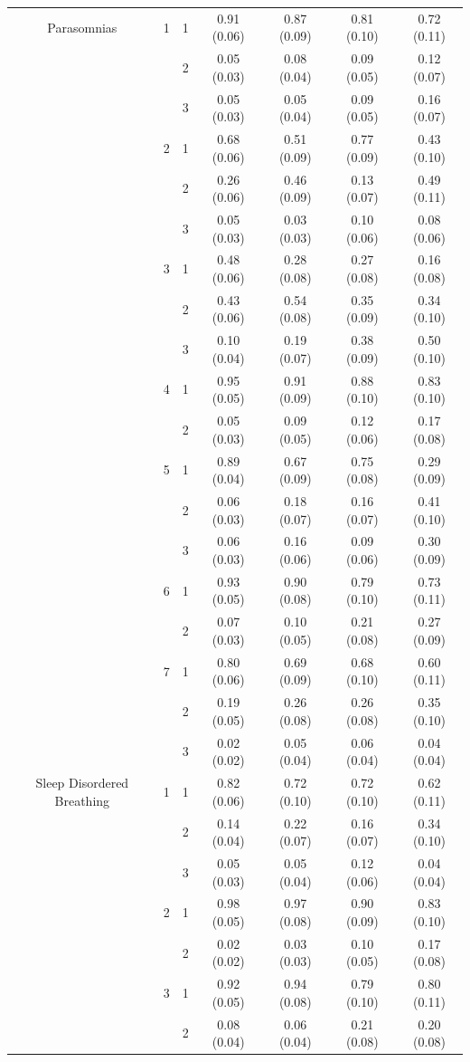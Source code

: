\documentclass[11pt]{article}
\theoremstyle{plain}
\theoremstyle{definition}
\begin{document}
\begin{longtable}{clccccc}
 Parasomnias  & 1 & 1  & 0.91  (0.06) &  0.87  (0.09) &  0.81 (0.10) & 0.72 (0.11) \\
 & & 2  & 0.05 (0.03) &  0.08  (0.04) & 0.09  (0.05) & 0.12 (0.07)\\
 & & 3  & 0.05 (0.03) &  0.05 (0.04) &  0.09 (0.05) & 0.16 (0.07)\\
  & 2 & 1  & 0.68  (0.06) &  0.51  (0.09) & 0.77  (0.09) & 0.43 (0.10)\\
 & & 2  & 0.26 (0.06) &  0.46  (0.09) & 0.13  (0.07) & 0.49 (0.11)\\
 & & 3  & 0.05 (0.03) &  0.03  (0.03) & 0.10  (0.06) & 0.08 (0.06)\\
   & 3 & 1  & 0.48 (0.06) &  0.28  (0.08) & 0.27  (0.08) & 0.16 (0.08)\\
 & & 2  & 0.43 (0.06) &  0.54  (0.08) & 0.35  (0.09) & 0.34 (0.10)\\
 & & 3  & 0.10 (0.04) &  0.19  (0.07) & 0.38  (0.09) & 0.50 (0.10)\\
    & 4 & 1  & 0.95  (0.05) &  0.91  (0.09) & 0.88  (0.10) & 0.83 (0.10)\\
 & & 2  & 0.05 (0.03) &  0.09  (0.05) & 0.12  (0.06) & 0.17 (0.08)\\
    & 5 & 1  & 0.89 (0.04) &  0.67  (0.09) & 0.75  (0.08) & 0.29 (0.09)\\
 & & 2  & 0.06 (0.03) &  0.18  (0.07) & 0.16  (0.07) & 0.41 (0.10)\\
 & & 3  & 0.06 (0.03) &  0.16  (0.06) & 0.09  (0.06) & 0.30 (0.09)\\
    & 6 & 1  & 0.93  (0.05) &  0.90  (0.08) & 0.79  (0.10) & 0.73 (0.11)\\
 & & 2  & 0.07 (0.03) &  0.10  (0.05) & 0.21  (0.08) & 0.27 (0.09)\\
    & 7 & 1  & 0.80 (0.06) &  0.69  (0.09) & 0.68  (0.10) & 0.60 (0.11)\\
 & & 2  & 0.19 (0.05) &  0.26  (0.08) & 0.26  (0.08) & 0.35 (0.10)\\
 & & 3  & 0.02 (0.02) &  0.05 (0.04) &  0.06 (0.04) & 0.04 (0.04)\\
 Sleep Disordered Breathing &1 & 1  & 0.82 (0.06) & 0.72  (0.10) &  0.72 (0.10) & 0.62 (0.11) \\
 & & 2  & 0.14 (0.04) &  0.22 (0.07) & 0.16  (0.07) & 0.34 (0.10) \\
 & & 3  & 0.05 (0.03) &  0.05 (0.04) & 0.12  (0.06) & 0.04 (0.04) \\
&2 & 1  & 0.98 (0.05) &  0.97 (0.08) & 0.90  (0.09) & 0.83 (0.10) \\
 & & 2  & 0.02 (0.02) &  0.03 (0.03) & 0.10  (0.05) & 0.17 (0.08) \\
&3 & 1  & 0.92 (0.05) &  0.94 (0.08) & 0.79  (0.10) & 0.80 (0.11) \\
&  & 2  & 0.08 (0.04) &  0.06 (0.04) & 0.21  (0.08) & 0.20 (0.08) \\


\end{longtable}
\end{document}
